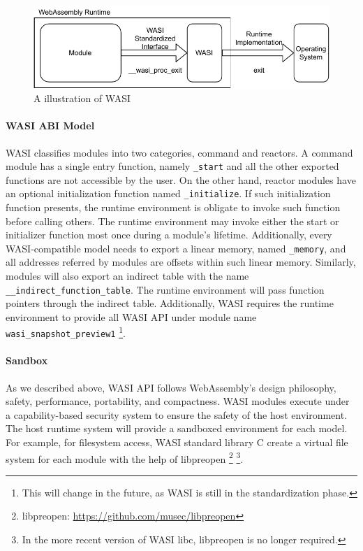 \begin{figure}
  \centering
  \includegraphics{Images/wasi-intro.pdf}
  \caption{A illustration of WASI}
  \label{fig:wasi-intro}
\end{figure}

\paragraph{WASI ABI Model}
WASI classifies modules into two categories, command and reactors. A command
module has a single entry function, namely \texttt{\_start} and all the other
exported functions are not accessible by the user. On the other hand, reactor
modules have an optional initialization function named \texttt{\_initialize}.
If such initialization function presents, the runtime environment is obligate
to invoke such function before calling others. The runtime environment may
invoke either the start or initializer function most once during a module's
lifetime. Additionally, every WASI-compatible model needs to export a linear
memory, named \texttt{\_memory}, and all addresses referred by modules are
offsets within such linear memory. Similarly, modules will also export an 
indirect table with the name \texttt{\_\_indirect\_function\_table}. The runtime
environment will pass function pointers through the indirect table.
Additionally, WASI requires the runtime environment to provide all WASI API
under module name \texttt{wasi\_snapshot\_preview1} 
\footnote{This will change in the future, as WASI is still in the
standardization phase.}.

\paragraph{Sandbox}
As we described above, WASI API follows WebAssembly's design philosophy, safety,
performance, portability, and compactness. WASI modules execute under a
capability-based security system to ensure the safety of the host environment.
The host runtime system will provide a sandboxed environment for each model.
For example, for filesystem access, WASI standard library C create a virtual
file system for each module with the help of libpreopen
\footnote{libpreopen: \url{https://github.com/musec/libpreopen}}
\footnote{In the more recent version of WASI libc, libpreopen is no longer
required.}.

